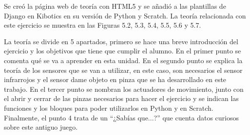 Se creó la página web de teoría con HTML5  y se añadió a las plantillas de Django en Kibotics en su versión de Python y Scratch. La teoría relacionada con este ejercicio se muestra en las Figuras 5.2, 5.3, 5.4, 5.5, 5.6 y 5.7. 

La teoría se divide en 5 apartados, primero se hace una breve introducción del ejercicio y los objetivos que tiene que cumplir el alumno. En el primer punto se comenta qué se va a aprender en esta unidad. En el segundo punto se explica la teoría de los sensores que se van a utilizar, en este caso, son necesarios el sensor infrarrojos y el sensor dame objeto en pinza que se ha desarrollado en este trabajo. En el tercer punto se nombran los actuadores de movimiento, junto con  el abrir y cerrar de las pinzas necesarios para hacer el ejercicio y se indican las funciones y los bloques para poder utilizarlos en Python y en Scratch. Finalmente, el punto 4 trata de un ``¿Sabías que...?''  que cuenta datos curiosos sobre este antiguo juego.


